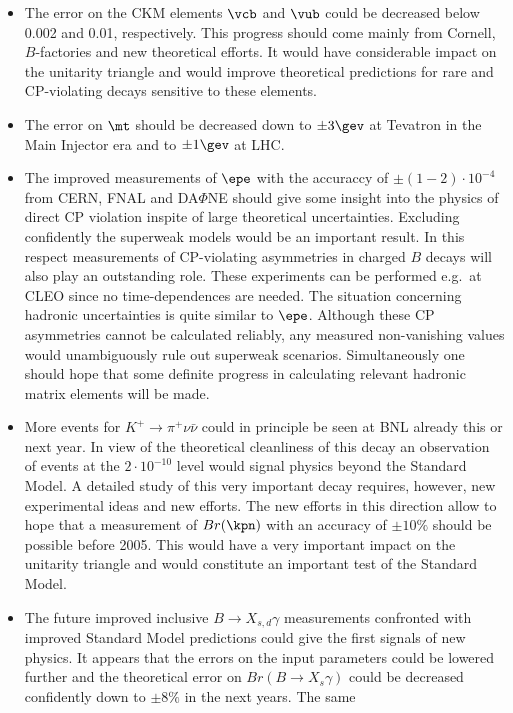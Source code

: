 \begin{itemize}
\item
The error on the CKM elements $\vcb$ and $\vub$ could be decreased 
below 0.002 and 0.01, respectively. This progress should come mainly from
Cornell, $B$-factories and new theoretical efforts. It would have
considerable impact on the unitarity triangle and would improve
theoretical predictions for rare and CP-violating decays sensitive
to these elements.
\item
The error on $\mt$ should be decreased down to $\pm 3\gev$
at Tevatron in the Main Injector era and to $\pm 1\gev$ at LHC.
\item
The improved measurements of $\epe$ with the accuraccy of
 $\pm (1-2) \cdot 10^{-4}$ 
from CERN, FNAL and DA$\Phi$NE should give some insight into the 
physics of 
direct CP violation inspite of large theoretical uncertainties. 
Excluding confidently the superweak models would be an important result. 
In this respect measurements of CP-violating asymmetries in charged $B$
decays will also play an outstanding role. These experiments can be
performed e.g.\ at CLEO since no time-dependences
are needed. The situation concerning hadronic uncertainties is quite similar
to $\epe$. Although these CP asymmetries cannot be calculated
reliably, any measured non-vanishing values would unambiguously rule out 
superweak scenarios. Simultaneously one should hope 
that some definite progress in calculating relevant hadronic matrix elements 
will be made. 
\item
More events for $K^+\to\pi^+\nu\bar\nu$ could in principle
be seen at BNL already this or next year. In view of the theoretical 
cleanliness of this decay an observation of events at the $2\cdot 10^{-10}$
level would signal physics beyond the Standard Model.
A detailed study of this very
important decay requires, however, new experimental ideas and
new efforts. The new efforts \cite{AGS2,Cooper} in this direction allow 
to hope that
a measurement of $Br(\kpn)$ with an accuracy of $\pm 10 \%$ should
be possible before 2005. This would have a very important impact
on the unitarity triangle and would constitute an important test of
the Standard Model.
\item
The future improved inclusive $B \to X_{s,d} \gamma$ measurements
confronted with improved Standard Model predictions could
give the first signals of new physics. It appears that the errors
on the input parameters could be lowered further and the
theoretical error on $Br(B\to X_s\gamma)$ could be decreased
confidently down to $\pm 8 \%$ in the next years. The same

\end{itemize}
